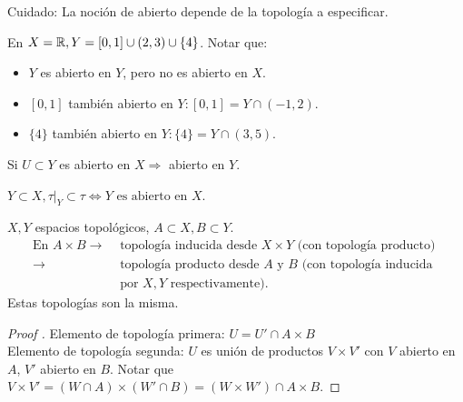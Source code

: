 \begin{remark}
	Cuidado: La noción de abierto depende de la topología a especificar.
\end{remark}

\begin{eg}
	En $X = \mathbb{R}, Y = [0,1] \cup (2,3) \cup \{ 4 \}$. Notar que:
	\begin{itemize}
		\item $Y$ es abierto en $Y$, pero no es abierto en $X$.

		\item $[0,1]$ también abierto en $Y : [0,1] = Y \cap (-1,2)$.

		\item $\{ 4 \}$ también abierto en $Y : \{ 4 \} = Y \cap (3,5)$.
	\end{itemize}
\end{eg}

\begin{note}
	Si $U \subset Y$ es abierto en $X \Rightarrow$ abierto en $Y$.
\end{note}

\begin{lemma}
	$Y \subset X, \tau|_Y \subset \tau \iff Y \text{ es abierto en } X$.
\end{lemma}

\begin{prop}
	$X,Y$ espacios topológicos, $A \subset X, B \subset Y$.
	\begin{align*}
		\text{En } A \times B \rightarrow & \text{ topología inducida desde } X \times Y \text{ (con topología producto) } \\
		\rightarrow & \text{ topología producto desde } A \text{ y } B \text{ (con topología inducida} \\
		& \text{ por } X,Y \text{ respectivamente)}
	.\end{align*}
	\noindent Estas topologías son la misma.
\end{prop}

\begin{proof}[Proof ]
	Elemento de topología primera: $U = U' \cap A \times B$ \\
	Elemento de topología segunda: $U$ es unión de productos $V \times V'$ con $V$ abierto en $A$, $V'$ abierto en $B$. Notar que $V \times V' = (W \cap A) \times (W' \cap B) = (W \times W') \cap A \times B$.
\end{proof}
